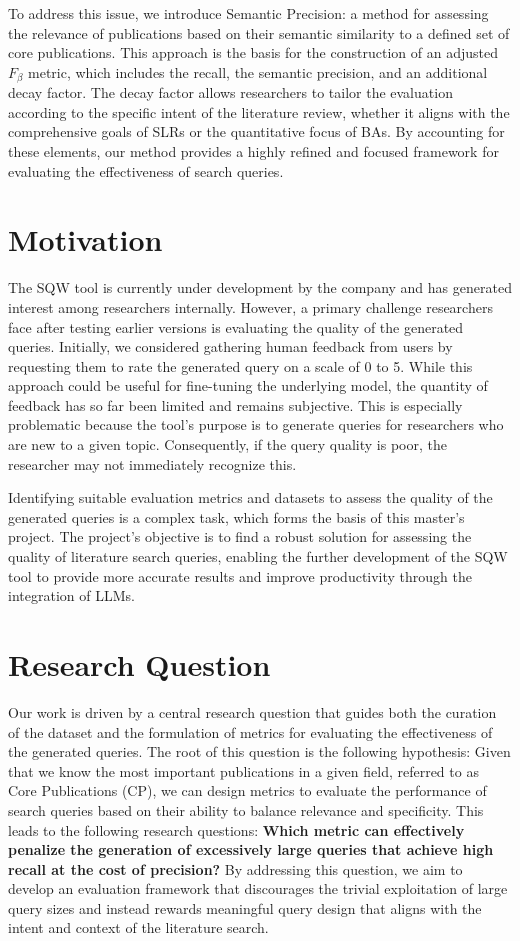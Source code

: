 To address this issue, we introduce Semantic Precision: a method for assessing the relevance of publications based on their semantic similarity to a defined set of core publications. This approach is the basis for the construction of an adjusted $F_\beta$ metric, which includes the recall, the semantic precision, and an additional decay factor. The decay factor allows researchers to tailor the evaluation according to the specific intent of the literature review, whether it aligns with the comprehensive goals of SLRs or the quantitative focus of BAs. By accounting for these elements, our method provides a highly refined and focused framework for evaluating the effectiveness of search queries.

\section{Motivation}
The SQW tool is currently under development by the company and has generated interest among researchers internally. However, a primary challenge researchers face after testing earlier versions is evaluating the quality of the generated queries. Initially, we considered gathering human feedback from users by requesting them to rate the generated query on a scale of 0 to 5. While this approach could be useful for fine-tuning the underlying model, the quantity of feedback has so far been limited and remains subjective. This is especially problematic because the tool’s purpose is to generate queries for researchers who are new to a given topic. Consequently, if the query quality is poor, the researcher may not immediately recognize this.

Identifying suitable evaluation metrics and datasets to assess the quality of the generated queries is a complex task, which forms the basis of this master's project. The project’s objective is to find a robust solution for assessing the quality of literature search queries, enabling the further development of the SQW tool to provide more accurate results and improve productivity through the integration of LLMs.


\section{Research Question}\label{sec:researchQuestions}

Our work is driven by a central research question that guides both the curation of the dataset and the formulation of metrics for evaluating the effectiveness of the generated queries. The root of this question is the following hypothesis: Given that we know the most important publications in a given field, referred to as Core Publications (CP), we can design metrics to evaluate the performance of search queries based on their ability to balance relevance and specificity. This leads to the following research questions: \textbf{Which metric can effectively penalize the generation of excessively large queries that achieve high recall at the cost of precision?} By addressing this question, we aim to develop an evaluation framework that discourages the trivial exploitation of large query sizes and instead rewards meaningful query design that aligns with the intent and context of the literature search.


